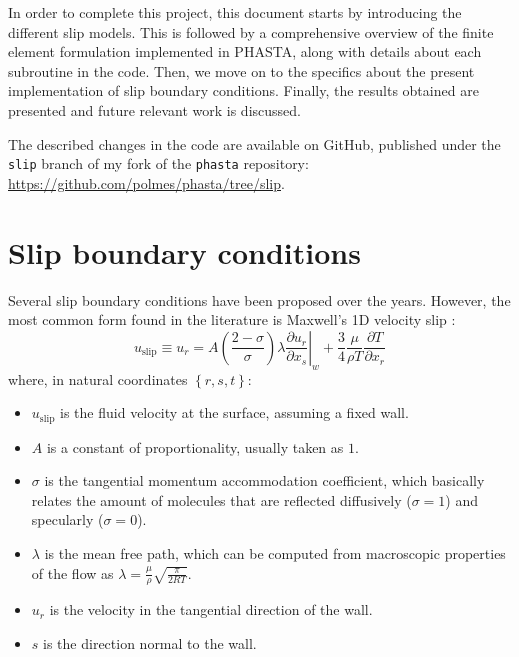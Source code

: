 \documentclass{ucb}
\begin{document}
In order to complete this project, this document starts by introducing the different slip models. This is followed by a comprehensive overview of the finite element formulation implemented in PHASTA, along with details about each subroutine in the code. Then, we move on to the specifics about the present implementation of slip boundary conditions. Finally, the results obtained are presented and future relevant work is discussed.

The described changes in the code are available on GitHub, published under the \texttt{slip} branch of my fork of the \texttt{phasta} repository: \url{https://github.com/polmes/phasta/tree/slip}.

\pagebreak

\section{Slip boundary conditions}
\label{sec:slip}

Several slip boundary conditions have been proposed over the years. However, the most common form found in the literature is Maxwell's 1D velocity slip \cite{maxwell, boydSlip}:
\begin{equation}
    u_\mathrm{slip} \equiv u_r = A\left(\frac{2-\sigma}{\sigma}\right)\lambda\left.\frac{\partial u_r}{\partial x_s}\right|_w + \frac{3}{4}\frac{\mu}{\rho T}\frac{\partial T}{\partial x_r}
    \label{eq:maxwell}
\end{equation}
where, in natural coordinates $\left\{r, s, t\right\}$:
\begin{itemize}
    \item $u_\mathrm{slip}$ is the fluid velocity at the surface, assuming a fixed wall.
    \item $A$ is a constant of proportionality, usually taken as $1$.
    \item $\sigma$ is the tangential momentum accommodation coefficient, which basically relates the amount of molecules that are reflected diffusively ($\sigma = 1$) and specularly ($\sigma = 0$).
    \item $\lambda$ is the mean free path, which can be computed from macroscopic properties of the flow as $\lambda = \frac{\mu}{\rho}\sqrt{\frac{\pi}{2RT}}$.
    \item $u_r$ is the velocity in the tangential direction of the wall.
    \item $s$ is the direction normal to the wall.
\end{itemize}
\end{document}
